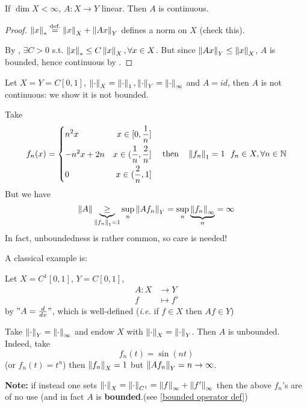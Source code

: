 \documentclass{article}
\begin{document}
\begin{corollary}
    If $\dim X < \infty$, $A: X\to Y$ linear. Then $A$ is continuous.
\end{corollary}  
\begin{proof}
    $\left\|{x}\right\|_* \stackrel{\text{def.}}{=} \left\|{x}\right\|_X + \left\|{Ax}\right\|_Y$ defines a norm on $X$ (check this).  
    
    By , $\exists C>0$ s.t. $\left\|{x}\right\|_* \leq C \left\|{x}\right\|_X, \forall x \in X$. But since $\left\|{Ax}\right\|_Y \leq \left\|{x}\right\|_X$, $A$ is bounded, hence continuous by .
\end{proof}

\begin{example}
    Let $X=Y=C[0,1]$, $\left\|{\cdot}\right\|_X=\left\|{\cdot}\right\|_1, \left\|{\cdot}\right\|_Y=\left\|{\cdot}\right\|_{\infty}$ and $A=id$, then $A$ is not continuous: we show it is not bounded.  

    Take 
    \begin{equation}\nonumber
f_n(x)=\left\{
\begin{aligned}
    &{n^2x} &x\in[0,\frac{1}{n}]\\
    &{-n^2x+2n} &x\in(\frac{1}{n},\frac{2}{n}]\\
    &0 &x\in(\frac{2}{n},1]\\
\end{aligned}
\right.\quad\text{then}\quad\left\|{f_n}\right\|_1=1  \  \ f_n \in X, \forall n \in \mathbb{N}
\end{equation}
But we have  
$$
\left\|{A}\right\| \underbrace{\geq}_{\left\|{f_n}\right\|_1=1} \sup_n \left\|{Af_n}\right\|_Y = \sup_n \underbrace{\left\|{f_n}\right\|_{\infty}}_n = \infty
$$
In fact, unboundedness is rather common, so care is needed!  
\end{example}  

A classical example is:  

\begin{example}
    Let $X=C^1[0,1]$, $Y=C[0,1]$, 
    \begin{align*}
        A: X &\to Y \\
        f &\mapsto f'
    \end{align*}
    by $"A = \frac{d}{dx}"$, which is well-defined (\textit{i.e.} if $f\in X$ then $Af \in Y$)

    Take $\left\|{\cdot}\right\|_Y = \left\|{\cdot}\right\|_{\infty}$ and endow $X$ with $\left\|{\cdot}\right\|_X = \left\|{\cdot}\right\|_Y$. Then $A$ is unbounded. Indeed, take  
    $$
    f_n(t) = \sin(nt) 
    $$
    (or $f_n(t)=t^n$) then $\left\|{f_n}\right\|_X=1$ but $\left\|{Af_n}\right\|_Y=n \to \infty$.

    \textbf{Note:} if instead one sets $\left\|{\cdot}\right\|_X = \left\|{\cdot}\right\|_{C^1}=\left\|{f}\right\|_{\infty}+\left\|{f'}\right\|_{\infty}$ then the above $f_n$'s are of no use (and in fact $A$ is {\bf{bounded}}.(see \cref{bounded operator def})
\end{example}  
\end{document}
